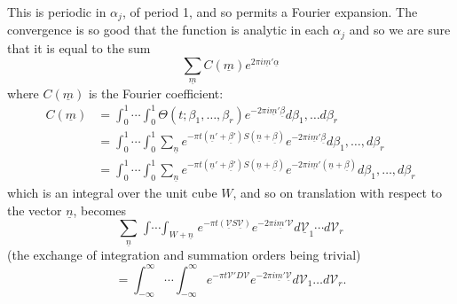 This is periodic in $\alpha_j$, of period 1, and so permits a Fourier
expansion. The convergence is so good that the function is analytic in
each $\alpha_j$ and so we are sure that it is equal to the sum
$$
\sum_{\underline{m}} C(\underline{m}) e^{2 \pi i \underline{m}' \underline{\alpha}}
$$ 
where $C(\underline{m})$ is the Fourier coefficient:
\begin{align*}
  C(\underline{m})& = \int^1_0\cdots \int^1_0 \Theta (t; \beta_1,
  \ldots , \beta_r) e^{-2 \pi i \underline{m}' \underline{\beta}} d
  \beta_1 , \ldots d \beta_r\\
  & = \int^1_0 \cdots \int^1_0 \sum_{\underline{n}} e^{- \pi t
    (\underline{n}'+ \underline{\beta}') S(\underline{n}+
    \underline{\beta})} e^{-2 \pi i \underline{m}' \underline{\beta}}
  d \beta_1 , \ldots , d \beta_r\\
  &= \int^1_0 \cdots \int^1_0 \sum_{\underline{n}} e^{- \pi t
    (\underline{n}'+ \underline{\beta}') S(\underline{n}+
    \underline{\beta})} e^{-2 \pi i \underline{m}' (\underline{n}+
    \underline{\beta})}  d \beta_1 , \ldots , d \beta_r
\end{align*}\pageoriginale
which is an integral over the unit cube $W$, and so on translation
with respect to the vector $\underline{n}$, becomes
$$
\sum_{\underline{n}} \mathop{\int\cdots \int}_{W+ \underline{n}} e^{-
  \pi t (\underline{\mathscr{V}} S \underline{\mathscr{V}})} e^{-2 \pi
i \underline{m}' \mathscr{V}} d\underline{\mathscr{V}}_1 \cdots  d
\mathscr{V}_r
$$
(the exchange of integration and summation orders being trivial)
$$
=\int_{-\infty}^\infty \cdots \int^\infty_{- \infty} e^{- \pi t
  \mathscr{V}'D \mathscr{V}} e^{-2 \pi i \underline{m}'
  \underline{\mathscr{V}}} d \mathscr{V}_1 \ldots d \mathscr{V}_r. 
$$
